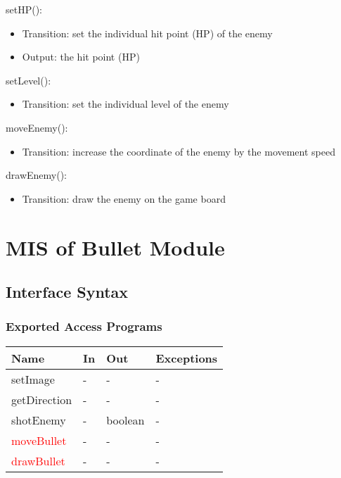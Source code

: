 \documentclass[12,english]{article}
\begin{document}
\noindent setHP():
\begin{itemize}
    \item Transition: set the individual hit point (HP) of the enemy
    \item Output: the hit point (HP)
\end{itemize}

\noindent setLevel():
\begin{itemize}
    \item Transition: set the individual level of the enemy
\end{itemize}

\noindent moveEnemy():
\begin{itemize}
    \item Transition: increase the coordinate of the enemy by the movement speed
\end{itemize}

\noindent drawEnemy():
\begin{itemize}
    \item Transition: draw the enemy on the game board
\end{itemize}



\section{MIS of Bullet Module}
\subsection{Interface Syntax}
\subsubsection{Exported Access Programs}
\begin{table}[h!]
    \centering
    \begin{tabular}{|p{4cm}|p{2cm}|p{2cm}|p{2cm}|}
    \hline
    \textbf {Name}  & {In} & {Out} & {Exceptions} \\
    \hline
    setImage & - & - & -\\
    \hline
    getDirection & - & - & -\\
    \hline
    shotEnemy & - & boolean & -\\
    \hline
    \textcolor{red}{moveBullet} & - & - & -\\
    \hline
    \textcolor{red}{drawBullet} & - & - & -\\
    \hline
    \end{tabular}
\end{table}
\end{document}
